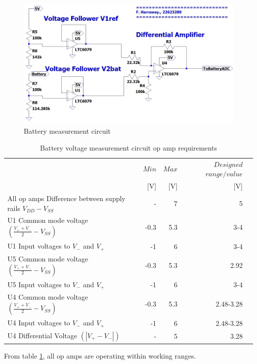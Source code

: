 \begin{figure}[!htb]
	\centering
	\includegraphics[width=0.5\linewidth]{Figures/A6/Batterysig.jpg}
	\caption{Battery measurement circuit}
	\label{fig:batcirc}
\end{figure}


\begin{table}[!htb]
	\centering
	\footnotesize
	\caption[Battery voltage measurement circuit op amp requirements]{Battery voltage measurement circuit op amp requirements \cite{MCP}}
	\begin{tabular}{lrrrr}
		\toprule
		& $Min$ &$Max$&$Designed$ $range / value$\\
		&[V]&[V]&[V]\\
		\midrule
		All op amps Difference between supply rails $V_{DD} - V_{SS}$ & -& 7  &5   \\
		
		U1 Common mode voltage $(\frac{V_+ + V_-}{2}-V_{SS})$ &  -0.3&5.3&3-4\\
		U1 Input voltages to $V_-$ and $V_+$  &  -1    &6& 3-4 \\
		
		U5 Common mode voltage $(\frac{V_+ + V_-}{2}-V_{SS})$ &  -0.3&5.3&2.92\\
		U5 Input voltages to $V_-$ and $V_+$ &  -1    &6& 3-4 \\
		
		
		U4 Common mode voltage $(\frac{V_+ + V_-}{2}-V_{SS})$ &  -0.3&5.3&2.48-3.28\\
		U4 Input voltages to $V_-$ and $V_+$  &  -1    &6&2.48-3.28 \\
		U4 Differential Voltage $ (|V_+ - V_-|)$ & -& 5&  3.28  \\
		
		\bottomrule
	\end{tabular}
	\label{tab:MCPbat}
\end{table}

From table \ref{tab:MCPbat}, all op amps are operating within working ranges.
\newpage
